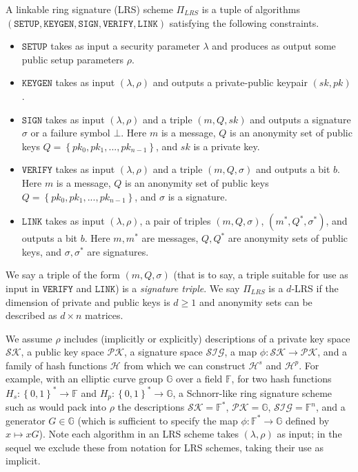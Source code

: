 \documentclass{llncs}
\begin{document}
\begin{definition}\label{def:lrs} A linkable ring signature (LRS) scheme $\Pi_{LRS}$ is a tuple of algorithms $(\texttt{SETUP}, \texttt{KEYGEN}, \texttt{SIGN}, \texttt{VERIFY}, \texttt{LINK})$ satisfying the following constraints.
\begin{itemize}
\item $\texttt{SETUP}$ takes as input a security parameter $\lambda$ and produces as output some public setup parameters $\rho$.

\item $\texttt{KEYGEN}$ takes as input $(\lambda, \rho)$ and outputs a private-public keypair $(sk, pk)$.

\item $\texttt{SIGN}$ takes as input $(\lambda, \rho)$ and a triple $(m, Q, sk)$ and outputs a signature $\sigma$ or a failure symbol $\bot$. Here $m$ is a message, $Q$ is an anonymity set of public keys $Q = \left\{pk_0, pk_1, ..., pk_{n-1}\right\}$, and $sk$ is a private key.

\item $\texttt{VERIFY}$ takes as input $(\lambda, \rho)$ and a triple $(m, Q, \sigma)$ and outputs a bit $b$. Here $m$ is a message, $Q$ is an anonymity set of public keys $Q = \left\{pk_0, pk_1, ..., pk_{n-1}\right\}$, and $\sigma$ is a signature.

\item $\texttt{LINK}$ takes as input $(\lambda, \rho)$, a pair of triples $(m, Q, \sigma)$, $(m^*, Q^*, \sigma^*)$, and outputs a bit $b$. Here $m, m^*$ are messages, $Q, Q^*$ are anonymity sets of public keys, and $\sigma, \sigma^*$ are signatures.
\end{itemize}
We say a triple of the form $(m, Q, \sigma)$ (that is to say, a triple suitable for use as input in $\texttt{VERIFY}$ and $\texttt{LINK}$) is a \textit{signature triple}. We say $\Pi_{LRS}$ is a $d$-LRS if the dimension of private and public keys is $d \geq 1$ and anonymity sets can be described as $d\times n$ matrices.
\end{definition}

We assume $\rho$ includes (implicitly or explicitly) descriptions of a private key space $\mathcal{SK}$, a public key space $\mathcal{PK}$, a signature space $\mathcal{SIG}$, a map $\phi: \mathcal{SK} \to \mathcal{PK}$, and a family of hash functions $\mathcal{H}$ from which we can construct $\mathcal{H}^s$ and $\mathcal{H}^p$. For example, with an elliptic curve group $\mathbb{G}$ over a field $\mathbb{F}$, for two hash functions $H_s:\left\{0,1\right\}^* \to \mathbb{F}$ and $H_p:\left\{0,1\right\}^* \to \mathbb{G}$, a Schnorr-like ring signature scheme such as \cite{liu2004linkable} would pack into $\rho$ the descriptions $\mathcal{SK} = \mathbb{F}^*$, $\mathcal{PK} = \mathbb{G}$, $\mathcal{SIG} = \mathbb{F}^n$, and a generator $G \in \mathbb{G}$ (which is sufficient to specify the map $\phi: \mathbb{F}^* \to \mathbb{G}$ defined by $x \mapsto xG$).  Note each algorithm in an LRS scheme takes $(\lambda, \rho)$ as input; in the sequel we exclude these from notation for LRS schemes, taking their use as implicit.
\end{document}
